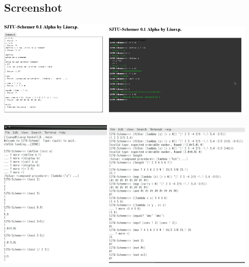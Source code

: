 \documentclass[11pt]{article}
\theoremstyle{definition}
\theoremstyle{remark}
\numberwithin{equation}{section}
\begin{document}
\subsection{Screenshot}
  \begin{center}
    \includegraphics[width=0.40\textwidth]{a.png}
    \includegraphics[width=0.53\textwidth]{b.png}
  \end{center}
\begin{center}
    \includegraphics[width=0.40\textwidth]{c.jpg}
    \includegraphics[width=0.53\textwidth]{d.jpg}
  \end{center}
\end{document}
